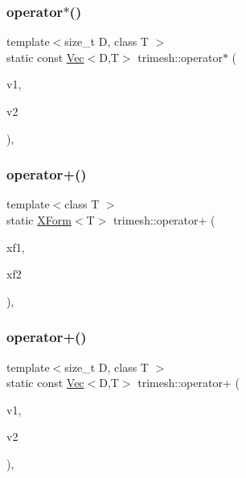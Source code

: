 \subsubsection{\texorpdfstring{operator$\ast$()}{operator*()}\hspace{0.1cm}{\footnotesize\ttfamily [3/3]}}
{\footnotesize\ttfamily template$<$size\+\_\+t D, class T $>$ \\
static const \hyperlink{classtrimesh_1_1Vec}{Vec}$<$D,T$>$ trimesh\+::operator$\ast$ (\begin{DoxyParamCaption}\item[{const \hyperlink{classtrimesh_1_1Vec}{Vec}$<$ D, T $>$ \&}]{v1,  }\item[{const \hyperlink{classtrimesh_1_1Vec}{Vec}$<$ D, T $>$ \&}]{v2 }\end{DoxyParamCaption})\hspace{0.3cm}{\ttfamily [inline]}, {\ttfamily [static]}}

\mbox{\label{namespacetrimesh_a2cf4a60d0201f630995ed0b4ba7c375d}} 
\subsubsection{\texorpdfstring{operator+()}{operator+()}\hspace{0.1cm}{\footnotesize\ttfamily [1/3]}}
{\footnotesize\ttfamily template$<$class T $>$ \\
static \hyperlink{classtrimesh_1_1XForm}{X\+Form}$<$T$>$ trimesh\+::operator+ (\begin{DoxyParamCaption}\item[{const \hyperlink{classtrimesh_1_1XForm}{X\+Form}$<$ T $>$ \&}]{xf1,  }\item[{const \hyperlink{classtrimesh_1_1XForm}{X\+Form}$<$ T $>$ \&}]{xf2 }\end{DoxyParamCaption})\hspace{0.3cm}{\ttfamily [inline]}, {\ttfamily [static]}}

\mbox{\label{namespacetrimesh_a2a14979005f160e87225b0e0cba5ae88}} 
\subsubsection{\texorpdfstring{operator+()}{operator+()}\hspace{0.1cm}{\footnotesize\ttfamily [2/3]}}
{\footnotesize\ttfamily template$<$size\+\_\+t D, class T $>$ \\
static const \hyperlink{classtrimesh_1_1Vec}{Vec}$<$D,T$>$ trimesh\+::operator+ (\begin{DoxyParamCaption}\item[{const \hyperlink{classtrimesh_1_1Vec}{Vec}$<$ D, T $>$ \&}]{v1,  }\item[{const \hyperlink{classtrimesh_1_1Vec}{Vec}$<$ D, T $>$ \&}]{v2 }\end{DoxyParamCaption})\hspace{0.3cm}{\ttfamily [inline]}, {\ttfamily [static]}}

